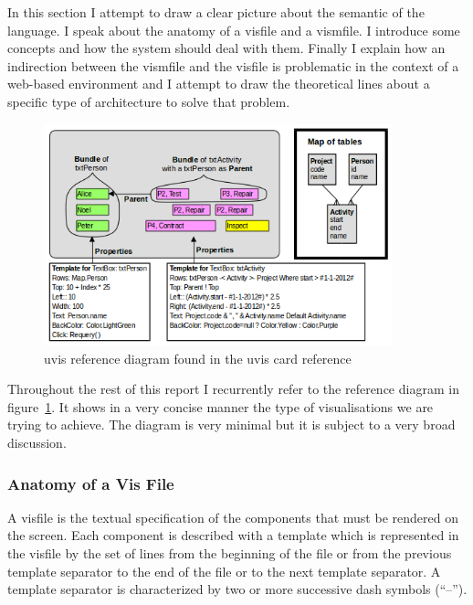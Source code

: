 In this section I attempt to draw a clear picture about the semantic of the language. I speak about the anatomy of a visfile and a vismfile. I introduce some concepts and how the system should deal with them. Finally I explain how an indirection between the vismfile and the visfile is problematic in the context of a web-based environment and I attempt to draw the theoretical lines about a specific type of architecture to solve that problem. 


\begin{figure}
    \centering
    \includegraphics[width=0.9\textwidth]{images/uvisDiagram.png}
    \caption{uvis reference diagram found in the uvis card reference}
    \label{img:refDiagram}
\end{figure}

Throughout the rest of this report I recurrently refer to the reference diagram in figure~\ref{img:refDiagram}. It shows in a very concise manner the type of visualisations we are trying to achieve. The diagram is very minimal but it is subject to a very broad discussion.

\subsubsection{Anatomy of a Vis File}



A visfile is the textual specification of the components that must be rendered on the screen. Each component is described with a template which is represented in the visfile by the set of lines from the beginning of the file or from the previous template separator to the end of the file or to the next template separator. A template separator is characterized by two or more successive dash symbols (``--'').

